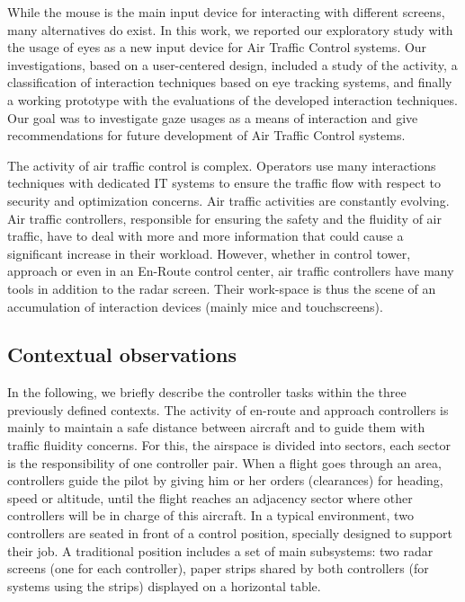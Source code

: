While the mouse is the main input device for interacting with different screens, many alternatives do exist. In this work, we reported our exploratory study with the usage of
eyes as a new input device for Air Traffic Control systems. Our investigations, based on a user-centered design, included a study of the activity, a classification of interaction
techniques based on eye tracking systems, and finally a working prototype with the evaluations of the developed interaction techniques. Our goal was to investigate gaze usages as a means of interaction and give recommendations for future development of Air Traffic Control systems.


The activity of air traffic control is complex. Operators use many interactions techniques with dedicated IT systems to ensure the traffic flow with respect to security and
optimization concerns. Air traffic activities are constantly evolving. Air traffic
controllers, responsible for ensuring the safety and the fluidity of air traffic, have to deal with more and more information that could cause a significant increase in their
workload. However, whether in control tower, approach or even in an En-Route control center, air traffic controllers have many tools in addition to the radar screen. Their
work-space is thus the scene of an accumulation of interaction devices (mainly mice and touchscreens).

\subsection{ Contextual observations }

In the following, we briefly describe the controller tasks within the three previously defined contexts. The activity of en-route and approach controllers is mainly to maintain a safe distance between aircraft and to guide them with traffic fluidity concerns. For this, the airspace is divided into sectors, each sector is the responsibility of one controller pair. When a flight goes through an area, controllers guide
the pilot by giving him or her orders (clearances) for heading, speed or altitude, until the flight reaches an adjacency sector where other controllers will be in charge of
this aircraft. In a typical environment, two controllers are seated in front of a control position, specially designed to support their job. A traditional position includes a set of
main subsystems: two radar screens (one for each controller), paper strips shared by both controllers (for systems using the strips) displayed on a horizontal table.

